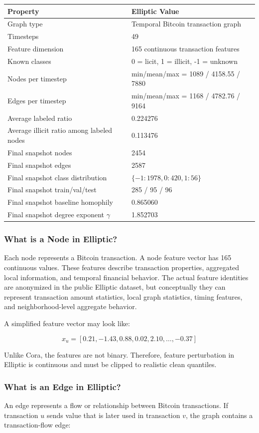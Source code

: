 \documentclass[12pt,a4paper]{article}
\begin{document}
\begin{longtable}{p{2.3in}p{3.5in}}
\toprule
\textbf{Property} & \textbf{Elliptic Value}\\
\midrule
Graph type & Temporal Bitcoin transaction graph\\
Timesteps & 49\\
Feature dimension & 165 continuous transaction features\\
Known classes & 0 = licit, 1 = illicit, -1 = unknown\\
Nodes per timestep & min/mean/max = 1089 / 4158.55 / 7880\\
Edges per timestep & min/mean/max = 1168 / 4782.76 / 9164\\
Average labeled ratio & 0.224276\\
Average illicit ratio among labeled nodes & 0.113476\\
Final snapshot nodes & 2454\\
Final snapshot edges & 2587\\
Final snapshot class distribution & $\{-1:1978,0:420,1:56\}$\\
Final snapshot train/val/test & 285 / 95 / 96\\
Final snapshot baseline homophily & 0.865060\\
Final snapshot degree exponent $\gamma$ & 1.852703\\
\bottomrule
\end{longtable}

\subsubsection{What is a Node in Elliptic?}
Each node represents a Bitcoin transaction. A node feature vector has 165 continuous values. These features describe transaction properties, aggregated local information, and temporal financial behavior. The actual feature identities are anonymized in the public Elliptic dataset, but conceptually they can represent transaction amount statistics, local graph statistics, timing features, and neighborhood-level aggregate behavior.

A simplified feature vector may look like:

$$
x_u = [0.21,-1.43,0.88,0.02,2.10,\ldots, -0.37]
$$

Unlike Cora, the features are not binary. Therefore, feature perturbation in Elliptic is continuous and must be clipped to realistic clean quantiles.

\subsubsection{What is an Edge in Elliptic?}
An edge represents a flow or relationship between Bitcoin transactions. If transaction $u$ sends value that is later used in transaction $v$, the graph contains a transaction-flow edge:
\end{document}
